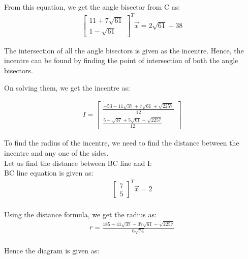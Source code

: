 \documentclass[journal,12pt,twocolumn]{IEEEtran}
\theoremstyle{remark}
\begin{document}
\\
From this equation, we get the angle bisector from C as:
  \begin{align}
        \begin{bmatrix}
            11 + 7\sqrt{61} \\
            1 - \sqrt{61}
        \end{bmatrix}^{T}
        \vec {x} = 2\sqrt{61}-38
    \end{align}

\bigskip
\begin{flushleft}
    The intersection of all the angle bisectors is given as the incentre.
Hence, the incentre can be found by finding the point of intersection of both
the angle bisectors.

On solving them, we get the incentre  as:
\end{flushleft}
\begin{align}
   I= \begin {bmatrix}
    \frac{-53-11\sqrt{37}+7\sqrt{61}+\sqrt{2257}}{12} \\ 
    \frac{5-\sqrt{37}+5\sqrt{61}-\sqrt{2257}}{12}
  \end{bmatrix}
\end{align}
\begin{flushleft}
    To find the radius of the incentre, we need to find the distance between 
    the incentre and any one of the sides. 
    \\
    Let us find the distance between BC line and I:
    \\
    BC line equation is given as:
    \bigskip
    \begin{align}
    \begin{bmatrix}
        7 \\
        5
    \end{bmatrix}^{T}
    \vec {x} = 2
    \end{align}
    \\
    Using the distance formula, we get the radius as:
    \\
    \begin{align}
    r = \frac{185+41\sqrt{37}-37\sqrt{61}-\sqrt{2257}}{6\sqrt{74}}
    \end{align}
    \\Hence the diagram is given as:
    \\
\end{flushleft}
\end{document}
